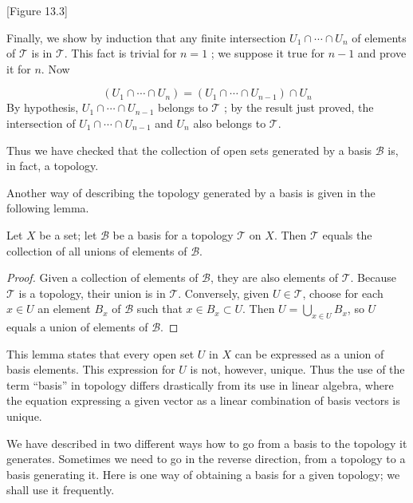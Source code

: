 [Figure 13.3]

Finally, we show by induction that any finite intersection \(U_{1} \cap \cdots \cap {U}_{n}\) of elements of \(\mathcal{T}\) is in \(\mathcal{T}\). This fact is trivial for \(n = 1\) ; we suppose it true for \(n - 1\) and prove it for \(n\). Now

\[
( {U_{1} \cap \cdots \cap {U}_{n}}) = ( {U_{1} \cap \cdots \cap {U}_{n - 1}}) \cap {U}_{n}
\]
By hypothesis, \(U_{1} \cap \cdots \cap {U}_{n - 1}\) belongs to \(\mathcal{T}\) ; by the result just proved, the intersection of \(U_{1} \cap \cdots \cap {U}_{n - 1}\) and \(U_{n}\) also belongs to \(\mathcal{T}\).

Thus we have checked that the collection of open sets generated by a basis \(\mathcal{B}\) is, in fact, a topology.

Another way of describing the topology generated by a basis is given in the following lemma.

\begin{lemma}
\label{lem:\thetheorem}
 Let \(X\) be a set; let \(\mathcal{B}\) be a basis for a topology \(\mathcal{T}\) on \(X\). Then \(\mathcal{T}\) equals the collection of all unions of elements of \(\mathcal{B}\).
\end{lemma}

\begin{proof}
 Given a collection of elements of \(\mathcal{B}\), they are also elements of \(\mathcal{T}\). Because \(\mathcal{T}\) is a topology, their union is in \(\mathcal{T}\). Conversely, given \(U \in \mathcal{T}\), choose for each \(x \in U\) an element \(B_{x}\) of \(\mathcal{B}\) such that \(x \in {B}_{x} \subset U\). Then \(U = \mathop{\bigcup }\limits_{{x \in U}}B_{x}\), so \(U\) equals a union of elements of \(\mathcal{B}\).
\end{proof}

This lemma states that every open set \(U\) in \(X\) can be expressed as a union of basis elements. This expression for \(U\) is not, however, unique. Thus the use of the term ``basis'' in topology differs drastically from its use in linear algebra, where the equation expressing a given vector as a linear combination of basis vectors is unique.

We have described in two different ways how to go from a basis to the topology it generates. Sometimes we need to go in the reverse direction, from a topology to a basis generating it. Here is one way of obtaining a basis for a given topology; we shall use it frequently.

